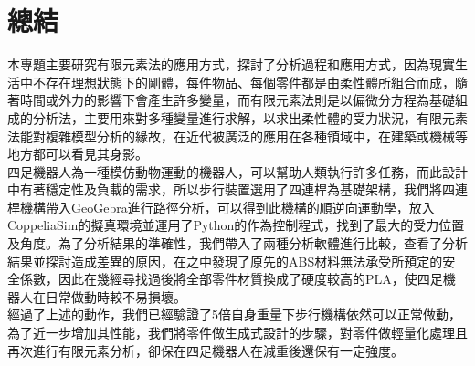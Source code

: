 \chapter{總結}
本專題主要研究有限元素法的應用方式，探討了分析過程和應用方式，因為現實生活中不存在理想狀態下的剛體，每件物品、每個零件都是由柔性體所組合而成，隨著時間或外力的影響下會產生許多變量，而有限元素法則是以偏微分方程為基礎組成的分析法，主要用來對多種變量進行求解，以求出柔性體的受力狀況，有限元素法能對複雜模型分析的緣故，在近代被廣泛的應用在各種領域中，在建築或機械等地方都可以看見其身影。\\

四足機器人為一種模仿動物運動的機器人，可以幫助人類執行許多任務，而此設計中有著穩定性及負載的需求，所以步行裝置選用了四連桿為基礎架構，我們將四連桿機構帶入GeoGebra進行路徑分析，可以得到此機構的順逆向運動學，放入CoppeliaSim的擬真環境並運用了Python的作為控制程式，找到了最大的受力位置及角度。為了分析結果的準確性，我們帶入了兩種分析軟體進行比較，查看了分析結果並探討造成差異的原因，在之中發現了原先的ABS材料無法承受所預定的安全係數，因此在幾經尋找過後將全部零件材質換成了硬度較高的PLA，使四足機器人在日常做動時較不易損壞。\\

經過了上述的動作，我們已經驗證了5倍自身重量下步行機構依然可以正常做動，為了近一步增加其性能，我們將零件做生成式設計的步驟，對零件做輕量化處理且再次進行有限元素分析，卻保在四足機器人在減重後還保有一定強度。

\newpage
